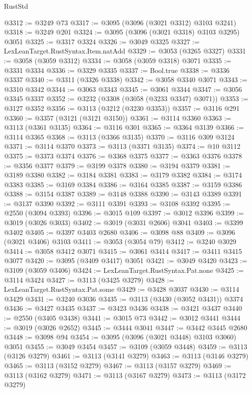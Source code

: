 \begin{lexlean}{RustStd}
\begin{coremodule}
@3312 := @3249 @73
@3317 := @3095 (@3096 (@3021 @3312) @3103 @3241)
@3318 := @3249 @201
@3324 := @3095 (@3096 (@3021 @3318) @3103 @3295) @3051
@3325 := @3317 @3324
@3326 := @3049 @3325
@3327 := LexLeanTarget.RustSyntax.Item.natAdd
@3329 := @3053 (@3265 @3327)
@3331 := @3058 (@3059 @3312)
@3334 := @3058 (@3059 @3318) @3071
@3335 := @3331 @3334
@3336 := @3329 @3335
@3337 := Bool.true
@3338 := @3336 @3337
@3340 := @3311 (@3326 @3338)
@3342 := @3058 @3340 @3071
@3343 := @3310 @3342
@3344 := @3063 @3343
@3345 := @3061 @3344
@3347 := @3056 @3345 @3337
@3352 := @3232 (@3308 (@3058 (@3233 @3347) @3071))
@3353 := @3127 @3352
@3356 := @3113 (@3212 (@3230 @3353))
@3357 := @3116 @291
@3360 := @3357 (@3121 (@3121 @3150))
@3361 := @3114 @3360
@3363 := @3113 (@3361 @3135)
@3364 := @3116 @301
@3365 := @3364 @3139
@3366 := @3114 @3365
@3368 := @3113 (@3366 @3135)
@3370 := @3116 @309 @3124
@3371 := @3114 @3370
@3373 := @3113 (@3371 @3135)
@3374 := @10 @3112
@3375 := @3373 @3374
@3376 := @3368 @3375
@3377 := @3363 @3376
@3378 := @3356 @3377
@3379 := @3199 @3378
@3380 := @3194 @3379
@3381 := @3189 @3380
@3382 := @3184 @3381
@3383 := @3179 @3382
@3384 := @3174 @3383
@3385 := @3169 @3384
@3386 := @3164 @3385
@3387 := @3159 @3386
@3388 := @3154 @3387
@3389 := @3148 @3388
@3390 := @3143 @3389
@3391 := @3137 @3390
@3392 := @3111 @3391
@3393 := @3108 @3392
@3395 := @2550 (@3094 @3393)
@3396 := @3015 @109
@3397 := @3012 @3396
@3399 := @3019 (@3026 @3033)
@3402 := @3019 (@3031 @2606) @3041
@3403 := @3399 @3402
@3405 := @3397 @3403 @2680
@3406 := @3098 @88
@3409 := @3096 (@3021 @3406) @3103
@3411 := @3053 (@3054 @79)
@3412 := @3240 @3029
@3414 := @3058 @3412 @3071
@3415 := @3061 @3414
@3417 := @3411 @3415 @3077
@3420 := @3095 (@3409 @3417) @3051
@3421 := @3049 @3420
@3423 := @3109 (@3059 @3406)
@3424 := LexLeanTarget.RustSyntax.Pat.none
@3425 := @3114 @3424
@3427 := @3113 (@3425 @3279)
@3428 := LexLeanTarget.RustSyntax.Pat.some
@3429 := @3428 @3037
@3430 := @3114 @3429
@3431 := @3240 @3036
@3435 := @3113 (@3430 (@3052 @3431)) @3374
@3436 := @3427 @3435
@3437 := @3423 @3436
@3438 := @3421 @3437
@3440 := @2550 (@3405 @3438)
@3441 := @3015 @73
@3442 := @3012 @3441
@3444 := @3019 (@3026 @2652)
@3445 := @3444 @3041
@3447 := @3442 @3445 @2680
@3448 := @3098 @94
@3454 := @3095 (@3096 (@3021 @3448) @3103 @3060) @3051
@3455 := @3049 @3454
@3457 := @3109 (@3059 @3448)
@3459 := @3113 (@3126 @3279)
@3461 := @3113 (@3141 @3279)
@3463 := @3113 (@3146 @3279)
@3465 := @3113 (@3152 @3279)
@3467 := @3113 (@3157 @3279)
@3469 := @3113 (@3162 @3279)
@3471 := @3113 (@3167 @3279)
@3473 := @3113 (@3172 @3279)

\end{coremodule}
\end{lexlean}
